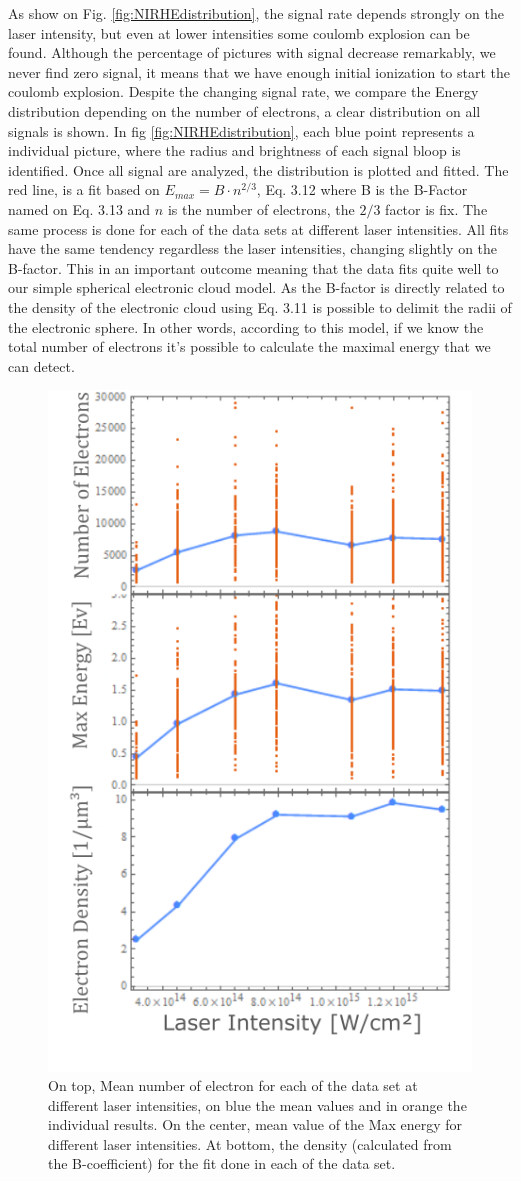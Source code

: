 As show on Fig. \ref{fig:NIRHEdistribution}, the signal rate depends strongly on the laser intensity, but even at lower intensities some coulomb explosion can be found. Although the percentage of pictures with signal decrease remarkably, we never find zero signal, it means that we have enough initial ionization to start the coulomb explosion. Despite the changing signal rate, we compare the Energy distribution depending on the number of electrons, a clear distribution on all signals is shown. In fig \ref{fig:NIRHEdistribution}, each blue point represents a individual picture, where the radius and brightness of each signal bloop is identified. Once all signal are analyzed, the distribution is plotted and fitted. The red line, is a fit based on $E_{max}= B \cdot n^{2/3}$, Eq. 3.12 where B is the B-Factor named on Eq. 3.13 and $n$ is the number of electrons, the $2/3$ factor is fix. The same process is done for each of the data sets at different laser intensities. All fits have the same tendency regardless the laser intensities, changing slightly on the B-factor. This in an important outcome meaning that the data fits quite well to our simple spherical electronic cloud model. As the B-factor is directly related to the density of the electronic cloud using Eq. 3.11 is possible to delimit the radii of the electronic sphere. In other words, according to this model, if we know the total number of electrons it’s possible to calculate the maximal energy that we can detect. 

\begin{figure}[h!]
\centering
\includegraphics[width=7 cm]{../Images/results/NIR_He_intensityscan/histograms mean.png} 
\caption[NIR Helium. Histograms for Energy and electrons)]{On top, Mean number of electron for each of the data set at different laser intensities, on blue the mean values and in orange the individual results. On the center, mean value of the Max energy for different laser intensities. At bottom, the density (calculated from the B-coefficient) for the fit done in each of the data set.}
\label{fig:NIRHEhistograms}
\end{figure}


